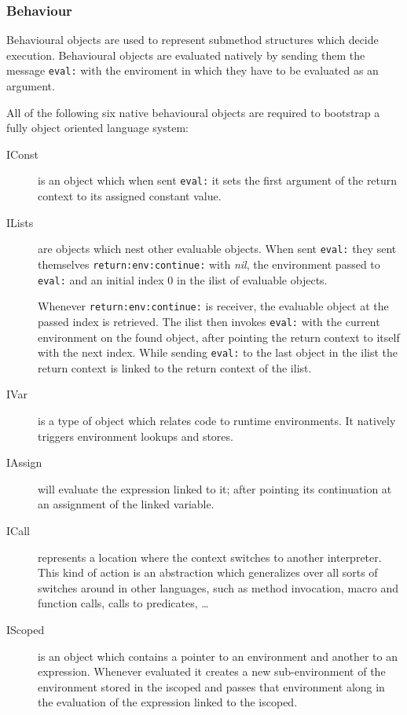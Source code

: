 \documentclass{article}
\begin{document}
\subsubsection{Behaviour}
Behavioural objects are used to represent submethod structures which decide
execution. Behavioural objects are evaluated natively by sending them the
message \verb$eval:$ with the enviroment in which they have to be evaluated as
an argument.

All of the following six native behavioural objects are required to bootstrap
a fully object oriented language system:

\begin{description}
    \item[IConst] is an object which when sent \verb$eval:$ it sets the first argument
                  of the return context to its assigned constant value.

    \item[ILists] are objects which nest other evaluable objects. When sent \verb$eval:$
                  they sent themselves \verb$return:env:continue:$ with \emph{nil}, the
                  environment passed to \verb$eval:$ and an initial index $0$ in the ilist of
                  evaluable objects.

                  Whenever \verb$return:env:continue:$ is receiver, the evaluable object at the
                  passed index is retrieved. The ilist then invokes \verb$eval:$ with the current
                  environment on the found object, after pointing the return context to itself
                  with the next index. While sending \verb$eval:$ to the last object in the ilist
                  the return context is linked to the return context of the ilist.


    \item[IVar]   is a type of object which relates code to runtime
                  environments. It natively triggers environment lookups and
                  stores.

    \item[IAssign] will evaluate the expression linked to it; after pointing
                   its continuation at an assignment of the linked variable.

    \item[ICall]   represents a location where the context switches to
                   another interpreter. This kind of action is an abstraction
                   which generalizes over all sorts of switches around in
                   other languages, such as method invocation, macro and
                   function calls, calls to predicates, \dots 

    \item[IScoped] is an object which contains a pointer to an environment and
                   another to an expression. Whenever evaluated it creates a
                   new sub-environment of the environment stored in the
                   iscoped and passes that environment along in the evaluation
                   of the expression linked to the iscoped.
\end{description}
\end{document}
